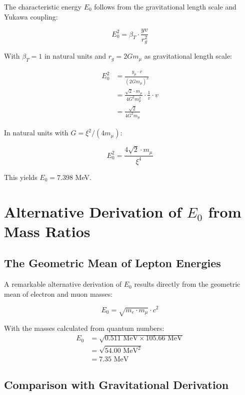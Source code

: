 \documentclass[12pt,a4paper]{article}
\begin{document}
	The characteristic energy $E_0$ follows from the gravitational length scale and Yukawa coupling:
	
	\begin{equation}
		E_0^2 = \beta_T \cdot \frac{yv}{r_g^2}
	\end{equation}
	
	With $\beta_T = 1$ in natural units and $r_g = 2Gm_\mu$ as gravitational length scale:
	
	\begin{align}
		E_0^2 &= \frac{y_\mu \cdot v}{(2Gm_\mu)^2}\\
		&= \frac{\sqrt{2} \cdot m_\mu}{4G^2 m_\mu^2} \cdot \frac{1}{v} \cdot v\\
		&= \frac{\sqrt{2}}{4G^2 m_\mu}
	\end{align}
	
	In natural units with $G = \xi^2/(4m_\mu)$:
	
	\begin{equation}
		E_0^2 = \frac{4\sqrt{2} \cdot m_\mu}{\xi^4}
	\end{equation}
	
	This yields $E_0 = 7.398$ MeV.
	
	\section{Alternative Derivation of $E_0$ from Mass Ratios}
	
	\subsection{The Geometric Mean of Lepton Energies}
	
	A remarkable alternative derivation of $E_0$ results directly from the geometric mean of electron and muon masses:
	
	\begin{equation}
		E_0 = \sqrt{m_e \cdot m_\mu} \cdot c^2
	\end{equation}
	
	With the masses calculated from quantum numbers:
	\begin{align}
		E_0 &= \sqrt{0.511 \text{ MeV} \times 105.66 \text{ MeV}}\\
		&= \sqrt{54.00 \text{ MeV}^2}\\
		&= 7.35 \text{ MeV}
	\end{align}
	
	\subsection{Comparison with Gravitational Derivation}
	
\end{document}
